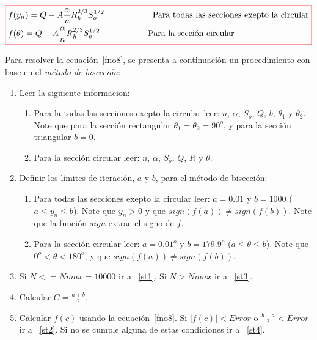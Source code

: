 \documentclass[11pt, oneside]{article}
\begin{document}
\begin{equation}
\color{red}\boxed{\color{black}
\begin{split}
& f(y_n) = Q - A\frac{\alpha}{n} R_h^{2/3} S_o^{1/2} \hspace{2cm} \text{Para todas las secciones exepto la circular}\\
& f(\theta) = Q - A\frac{\alpha}{n} R_h^{2/3} S_o^{1/2} \hspace{2cm} \text{Para la secci\'on circular}\\
\end{split}
}
\label{fno8}
\end{equation}

Para resolver la ecuaci\'on~\ref{fno8}, se presenta a continuaci\'on un procedimiento con base en el \emph{m\'etodo de bisecci\'on}:
\begin{enumerate}
\item Leer la siguiente informacion:

\begin{enumerate}
\item Para la todas las secciones exepto la circular leer: $n$, $\alpha$, $S_o$, $Q$, $b$, $\theta_1$ y $\theta_2$. Note que para la secci\'on rectangular $\theta_1 = \theta_2 = 90^o$, y para la secci\'on triangular $b=0$.
\item Para la secci\'on circular leer: $n$, $\alpha$, $S_o$, $Q$, $R$ y $\theta$.
\end{enumerate}

\item Definir los l\'imites de iteraci\'on, $a$ y $b$, para el m\'etodo de bisecci\'on:
\begin{enumerate}
\item Para todas las secciones exepto la circular leer: $a = 0.01$ y $b=1000$ ($a \le y_n \le b$). Note que $y_n > 0$ y que $sign(f(a)) \neq sign(f(b)) $. Note que la funci\'on $sign$ extrae el signo de $f$.
\item Para la secci\'on circular leer: $a=0.01^o$ y $b=179.9^o$ ($a \le \theta \le b$). Note que $ 0^o < \theta < 180^o $, y que $sign(f(a)) \neq sign(f(b)) $. 
\end{enumerate}

\item \label{st5} Si $N <= Nmax=10000$ ir a ~\ref{st1}. Si $N > Nmax$ ir a ~\ref{st3}.  
\item \label{st1} Calcular $C = \frac{a+b}{2}$.
\item Calcular $f(c)$ usando la ecuaci\'on~\ref{fno8}. Si $|f(c)|< Error$ o $\frac{b-a}{2} < Error$ ir a ~\ref{st2}. Si no se cumple alguna de estas  condiciones ir a ~\ref{st4}.


\end{enumerate}
\end{document}
